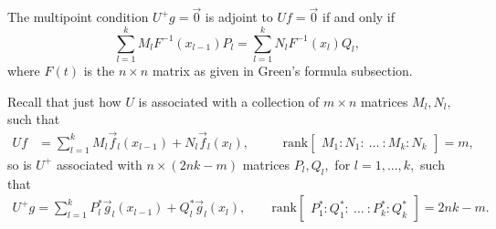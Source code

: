 \documentclass[10pt,reqno,oneside,a4paper]{article}
\begin{document}
\begin{thm}\label{P2.CA-theorem}
The multipoint condition $U^+g = \vec{0}$ is adjoint to $Uf = \vec{0}$ if and only if \[ \sum^k_{l=1} M_lF^{-1}(x_{l-1})P_l = \sum^k_{l=1} N_l F^{-1}(x_l)Q_l, \] where $F(t)$ is the $n\times n$ matrix as given in Green's formula subsection.  
\end{thm}
Recall that just how $U$ is associated with a collection of $m\times n$ matrices $M_l, N_l,$ such that 
\begin{align}
Uf &= \sum^k_{l=1} M_l \vec{f}_l(x_{l-1}) + N_l  \vec{f}_l(x_l), \quad &&\mathrm{rank}\begin{bmatrix} M_1 : N_1 :~ \ldots ~: M_k : N_k \end{bmatrix} = m, \label{P2.CA-U} 
\end{align}
so is $U^+$ associated with $n\times(2nk-m)$ matrices $P_l, Q_l,$ for  $l =1 ,\ldots, k,$ such that 
\begin{align}
U^+g = \sum^k_{l=1} P^*_l \vec{g}_l(x_{l-1}) + Q^*_l \vec{g}_l(x_l), \qquad \mathrm{rank}\begin{bmatrix} P^*_1 : Q^*_1 :~ \ldots ~: P^*_k : Q^*_k \end{bmatrix} = 2nk-m. \label{P2.CA-U+}
\end{align} 
\end{document}
